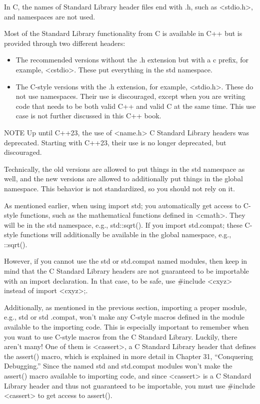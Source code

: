 In C, the names of Standard Library header files end with .h, such as <stdio.h>, and namespaces are not used.

Most of the Standard Library functionality from C is available in C++ but is provided through two different headers:

\begin{itemize}
\item
The recommended versions without the .h extension but with a c prefix, for example, <cstdio>. These put everything in the std namespace.

\item
The C-style versions with the .h extension, for example, <stdio.h>. These do not use namespaces. Their use is discouraged, except when you are writing code that needs to be both valid C++ and valid C at the same time. This use case is not further discussed in this C++ book.
\end{itemize}


\begin{myNotic}{NOTE}
Up until C++23, the use of <name.h> C Standard Library headers was deprecated. Starting with C++23, their use is no longer deprecated, but discouraged.
\end{myNotic}

Technically, the old versions are allowed to put things in the std namespace as well, and the new versions are allowed to additionally put things in the global namespace. This behavior is not standardized, so you should not rely on it.

As mentioned earlier, when using import std; you automatically get access to C-style functions, such as the mathematical functions defined in <cmath>. They will be in the std namespace, e.g., std::sqrt(). If you import std.compat; these C-style functions will additionally be available in the global namespace, e.g., ::sqrt().

However, if you cannot use the std or std.compat named modules, then keep in mind that the C Standard Library headers are not guaranteed to be importable with an import declaration. In that case, to be safe, use \#include <cxyz> instead of import <cxyz>;.

Additionally, as mentioned in the previous section, importing a proper module, e.g., std or std .compat, won’t make any C-style macros defined in the module available to the importing code. This is especially important to remember when you want to use C-style macros from the C Standard Library. Luckily, there aren’t many! One of them is <cassert>, a C Standard Library header that defines the assert() macro, which is explained in more detail in Chapter 31, “Conquering Debugging.” Since the named std and std.compat modules won’t make the assert() macro available to importing code, and since <cassert> is a C Standard Library header and thus not guaranteed to be importable, you must use \#include <cassert> to get access to assert().

